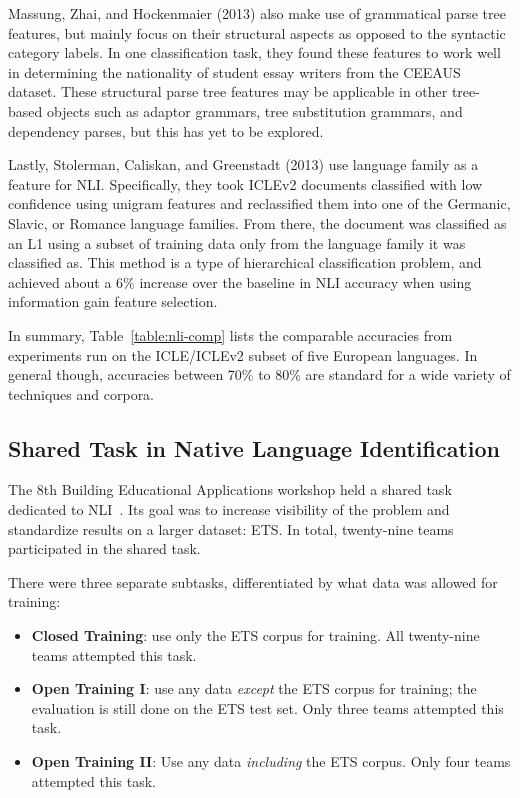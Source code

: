 Massung, Zhai, and Hockenmaier (2013) also make use of grammatical parse tree features, but mainly
focus on their structural aspects as opposed to the syntactic category labels.
In one classification task, they found these features to work well in
determining the nationality of student essay writers from the CEEAUS dataset.
These structural parse tree features may be applicable in other tree-based
objects such as adaptor grammars, tree substitution grammars, and dependency
parses, but this has yet to be explored.

Lastly, Stolerman, Caliskan, and Greenstadt (2013) use language family as a feature for NLI\@. Specifically,
they took ICLEv2 documents classified with low confidence using unigram features
and reclassified them into one of the Germanic, Slavic, or Romance language
families. From there, the document was classified as an L1 using a subset of
training data only from the language family it was classified as. This method is
a type of hierarchical classification problem, and achieved about a $6\%$
increase over the baseline in NLI accuracy when using information gain feature
selection.

In summary, Table~\ref{table:nli-comp} lists the comparable accuracies from
experiments run on the ICLE/ICLEv2 subset of five European languages. In general
though, accuracies between 70\% to 80\% are standard for a wide variety of
techniques and corpora.

\subsection{Shared Task in Native Language Identification}
\label{subsec:nli-shared}

The 8th Building Educational Applications workshop held a shared task dedicated
to NLI~\cite{nli-shared}. Its goal was to increase visibility of
the problem and standardize results on a larger dataset: ETS\@. In total,
twenty-nine teams participated in the shared task.

There were three separate subtasks, differentiated by what data was allowed for
training:

\begin{itemize}
    \item \textbf{Closed Training}: use only the ETS corpus for training. All
        twenty-nine teams attempted this task.
    \item \textbf{Open Training I}: use any data \emph{except} the ETS corpus
        for training; the evaluation is still done on the ETS test set. Only
        three teams attempted this task.
    \item \textbf{Open Training II}: Use any data \emph{including} the ETS
        corpus. Only four teams attempted this task.
\end{itemize}

